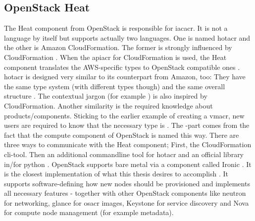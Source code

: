 \subsection{OpenStack Heat}
The Heat component from OpenStack is responsible for \gls{iacacr}. It is not a language by itself but supports actually two languages. One is named \gls{hotacr} and the other is Amazon CloudFormation. The former is strongly influenced by CloudFormation \cite{openstack_heat_template_guide}. When the \gls{apiacr} for CloudFormation is used, the Heat component translates the AWS-specific types to OpenStack compatible ones \cite{openstack_heat_architecture}.
\newline
\Gls{hotacr} is designed very similar to its counterpart from Amazon, too: They have the same type system (with different types though) and the same overall structure \cite{openstack_heat_architecture}. The contextual jargon (for example ) is also inspired by CloudFormation.
\newline
Another similarity is the required knowledge about products/components. Sticking to the earlier example of creating a \gls{vmacr}, new users are required to know that the necessary type is . The -part comes from the fact that the compute component of OpenStack is named this way.
\newline
There are three ways to communicate with the Heat component; First, the CloudFormation cli-tool. Then an additional commandline tool for \gls{hotacr} \cite{openstack_cli_heat} and an official library in/for python \cite{openstack_python_heat}.
\newline
OpenStack supports bare metal via a component called Ironic \cite{openstack_ironic_architecture}. It is the closest implementation of what this thesis desires to accomplish \cite{redhat_bare_metal}. It supports software-defining how new nodes should be provisioned and implements all necessary features - together with other OpenStack components like neutron for networking, glance for \gls{osacr} images, Keystone for service discovery and Nova for compute node management (for example metadata).


